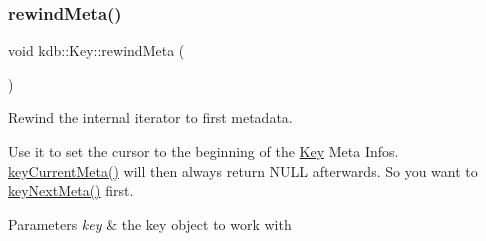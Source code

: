\subsubsection{\texorpdfstring{rewind\+Meta()}{rewindMeta()}}
{\footnotesize\ttfamily void kdb\+::\+Key\+::rewind\+Meta (\begin{DoxyParamCaption}{ }\end{DoxyParamCaption})\hspace{0.3cm}{\ttfamily [inline]}}



Rewind the internal iterator to first metadata. 

Use it to set the cursor to the beginning of the \hyperlink{classkdb_1_1Key}{Key} Meta Infos. \hyperlink{group__keymeta_ga74a273f529030f4947df52e14fdd2869}{key\+Current\+Meta()} will then always return N\+U\+LL afterwards. So you want to \hyperlink{group__keymeta_ga4c88342f580a4291455a801af71ce048}{key\+Next\+Meta()} first.





\begin{DoxyParams}{Parameters}
{\em key} & the key object to work with \\
\hline
\end{DoxyParams}


